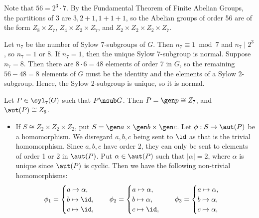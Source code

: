 \begin{solenum}[spsol]
    \item Note that $56 = 2^3 \cdot 7$.
	By the Fundamental Theorem of Finite Abelian Groups, the partitions of 3 are $3, 2 + 1, 1 + 1 + 1$, so the Abelian groups of order 56 are of the form $Z_8 \times Z_7$, $Z_4 \times Z_2 \times Z_7$, and $Z_2 \times Z_2 \times Z_2 \times Z_7$.
    \item Let $n_7$ be the number of Sylow 7-subgroups of $G$.
	Then $n_7 \equiv 1 \bmod 7$ and $n_7 \mid 2^3$, so $n_7 = 1$ or $8$.
	If $n_7 = 1$, then the unique Sylow 7-subgroup is normal.
	Suppose $n_7 = 8$.
	Then there are $8 \cdot 6 = 48$ elements of order 7 in $G$, so the remaining $56 - 48 = 8$ elements of $G$ must be the identity and the elements of a Sylow 2-subgroup.
	Hence, the Sylow 2-subgroup is unique, so it is normal.
    \item Let $P \in \syl_7(G)$ such that $P \nsub G$.
	Then $P = \gen p \cong Z_7$, and $\aut(P) \cong Z_6$.
    \begin{itemize}
        \item If $S \cong Z_2 \times Z_2 \times Z_2$, put $S = \gen a \times \gen b \times \gen c$.
        Let $\phi : S \to \aut(P)$ be a homomorphism.
        We disregard $a, b, c$ being sent to $\id$ as that is the trivial homomorphism.
        Since $a, b, c$ have order 2, they can only be sent to elements of order 1 or 2 in $\aut(P)$.
        Put $\alpha \in \aut(P)$ such that $|\alpha| = 2$, where $\alpha$ is unique since $\aut(P)$ is cyclic.
        Then we have the following non-trivial homomorphisms:
        \[
        	\phi_1 = 
            \begin{cases}
                a \mapsto \alpha, \\
                b \mapsto \id, \\
                c \mapsto \id,
            \end{cases} \quad
            \phi_2 =
            \begin{cases}
                a \mapsto \alpha, \\
                b \mapsto \alpha, \\
                c \mapsto \id,
            \end{cases} \quad
            \phi_3 =
            \begin{cases}
                a \mapsto \alpha, \\
                b \mapsto \alpha, \\
                c \mapsto \alpha,
            \end{cases}
\]
\end{itemize}
\end{solenum}
